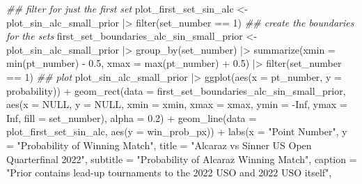 \documentclass[
  letterpaper,
  DIV=11,
  numbers=noendperiod]{scrartcl}
\newenvironment{Shaded}{\begin{snugshade}}{\end{snugshade}}
\newcommand{\AttributeTok}[1]{\textcolor[rgb]{0.40,0.45,0.13}{#1}}
\newcommand{\ConstantTok}[1]{\textcolor[rgb]{0.56,0.35,0.01}{#1}}
\newcommand{\DecValTok}[1]{\textcolor[rgb]{0.68,0.00,0.00}{#1}}
\newcommand{\DocumentationTok}[1]{\textcolor[rgb]{0.37,0.37,0.37}{\textit{#1}}}
\newcommand{\FloatTok}[1]{\textcolor[rgb]{0.68,0.00,0.00}{#1}}
\newcommand{\FunctionTok}[1]{\textcolor[rgb]{0.28,0.35,0.67}{#1}}
\newcommand{\NormalTok}[1]{\textcolor[rgb]{0.00,0.23,0.31}{#1}}
\newcommand{\OtherTok}[1]{\textcolor[rgb]{0.00,0.23,0.31}{#1}}
\newcommand{\SpecialCharTok}[1]{\textcolor[rgb]{0.37,0.37,0.37}{#1}}
\newcommand{\StringTok}[1]{\textcolor[rgb]{0.13,0.47,0.30}{#1}}
\begin{document}
\begin{Shaded}
\begin{Highlighting}[]
\DocumentationTok{\#\# filter for just the first set}
\NormalTok{plot\_first\_set\_sin\_alc }\OtherTok{\textless{}{-}}\NormalTok{ plot\_sin\_alc\_small\_prior }\SpecialCharTok{|\textgreater{}}
  \FunctionTok{filter}\NormalTok{(set\_number }\SpecialCharTok{==} \DecValTok{1}\NormalTok{)}
\DocumentationTok{\#\# create the boundaries for the sets}
\NormalTok{first\_set\_boundaries\_alc\_sin\_small\_prior }\OtherTok{\textless{}{-}}\NormalTok{ plot\_sin\_alc\_small\_prior }\SpecialCharTok{|\textgreater{}}
  \FunctionTok{group\_by}\NormalTok{(set\_number) }\SpecialCharTok{|\textgreater{}}
  \FunctionTok{summarize}\NormalTok{(}\AttributeTok{xmin =} \FunctionTok{min}\NormalTok{(pt\_number) }\SpecialCharTok{{-}} \FloatTok{0.5}\NormalTok{,}
            \AttributeTok{xmax =} \FunctionTok{max}\NormalTok{(pt\_number) }\SpecialCharTok{+} \FloatTok{0.5}\NormalTok{) }\SpecialCharTok{|\textgreater{}}
  \FunctionTok{filter}\NormalTok{(set\_number }\SpecialCharTok{==} \DecValTok{1}\NormalTok{)}
\DocumentationTok{\#\# plot}
\NormalTok{plot\_sin\_alc\_small\_prior }\SpecialCharTok{|\textgreater{}} \FunctionTok{ggplot}\NormalTok{(}\FunctionTok{aes}\NormalTok{(}\AttributeTok{x =}\NormalTok{ pt\_number, }\AttributeTok{y =}\NormalTok{ probability)) }\SpecialCharTok{+}
  \FunctionTok{geom\_rect}\NormalTok{(}\AttributeTok{data =}\NormalTok{ first\_set\_boundaries\_alc\_sin\_small\_prior, }
            \FunctionTok{aes}\NormalTok{(}\AttributeTok{x =} \ConstantTok{NULL}\NormalTok{, }\AttributeTok{y =} \ConstantTok{NULL}\NormalTok{, }\AttributeTok{xmin =}\NormalTok{ xmin, }\AttributeTok{xmax =}\NormalTok{ xmax, }
                \AttributeTok{ymin =} \SpecialCharTok{{-}}\ConstantTok{Inf}\NormalTok{, }\AttributeTok{ymax =} \ConstantTok{Inf}\NormalTok{, }\AttributeTok{fill =}\NormalTok{ set\_number), }\AttributeTok{alpha =} \FloatTok{0.2}\NormalTok{) }\SpecialCharTok{+} 
  \FunctionTok{geom\_line}\NormalTok{(}\AttributeTok{data =}\NormalTok{ plot\_first\_set\_sin\_alc, }\FunctionTok{aes}\NormalTok{(}\AttributeTok{y =}\NormalTok{ win\_prob\_px)) }\SpecialCharTok{+}
  \FunctionTok{labs}\NormalTok{(}\AttributeTok{x =} \StringTok{"Point Number"}\NormalTok{,}
       \AttributeTok{y =} \StringTok{"Probability of Winning Match"}\NormalTok{,}
       \AttributeTok{title =} \StringTok{"Alcaraz vs Sinner US Open Quarterfinal 2022"}\NormalTok{,}
       \AttributeTok{subtitle =} \StringTok{"Probability of Alcaraz Winning Match"}\NormalTok{,}
       \AttributeTok{caption =} \StringTok{"Prior contains \textquotesingle{}lead{-}up\textquotesingle{} tournaments to the 2022 USO and 2022 USO itself"}\NormalTok{,}

\end{Highlighting}
\end{Shaded}
\end{document}
